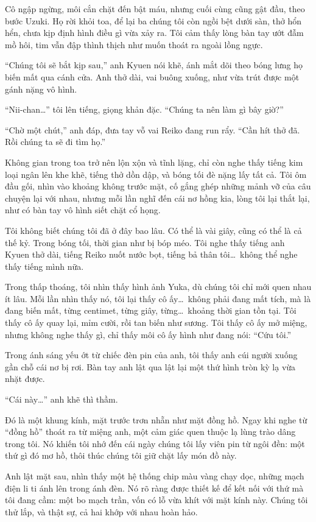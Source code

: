 \documentclass[../main.tex]{subfiles}
\begin{document}
Cô ngập ngừng, môi cắn chặt đến bật máu, nhưng cuối cùng cũng gật đầu, theo bước Uzuki. Họ rời khỏi toa, để lại ba chúng tôi còn ngồi bệt dưới sàn, thở hổn hển, chưa kịp định hình điều gì vừa xảy ra. Tôi cảm thấy lòng bàn tay ướt đẫm mồ hôi, tim vẫn đập thình thịch như muốn thoát ra ngoài lồng ngực.

``Chúng tôi sẽ bắt kịp sau,'' anh Kyuen nói khẽ, ánh mắt dõi theo bóng lưng họ biến mất qua cánh cửa. Anh thở dài, vai buông xuống, như vừa trút được một gánh nặng vô hình.

``Nii-chan\dots'' tôi lên tiếng, giọng khản đặc. ``Chúng ta nên làm gì bây giờ?''

``Chờ một chút,'' anh đáp, đưa tay vỗ vai Reiko đang run rẩy. ``Cần hít thở đã. Rồi chúng ta sẽ đi tìm họ.''

Không gian trong toa trở nên lộn xộn và tĩnh lặng, chỉ còn nghe thấy tiếng kim loại ngân lên khe khẽ, tiếng thở dồn dập, và bóng tối đè nặng lấy tất cả. Tôi ôm đầu gối, nhìn vào khoảng không trước mặt, cố gắng ghép những mảnh vỡ của câu chuyện lại với nhau, nhưng mỗi lần nghĩ đến cái nơ hồng kia, lòng tôi lại thắt lại, như có bàn tay vô hình siết chặt cổ họng.

Tôi không biết chúng tôi đã ở đây bao lâu. Có thể là vài giây, cũng có thể là cả thế kỷ. Trong bóng tối, thời gian như bị bóp méo. Tôi nghe thấy tiếng anh Kyuen thở dài, tiếng Reiko nuốt nước bọt, tiếng bả thân tôi\dots\ không thể nghe thấy tiếng mình nữa.

Trong thấp thoáng, tôi nhìn thấy hình ảnh Yuka, dù chúng tôi chỉ mới quen nhau ít lâu. Mỗi lần nhìn thấy nó, tôi lại thấy cô ấy\dots\ không phải đang mất tích, mà là đang biến mất, từng centimet, từng giây, từng\dots\ khoảng thời gian tồn tại. Tôi thấy cô ấy quay lại, mỉm cười, rồi tan biến như sương. Tôi thấy cô ấy mở miệng, nhưng không nghe thấy gì, chỉ thấy môi cô ấy hình như đang nói: ``Cứu tôi.''

Trong ánh sáng yếu ớt từ chiếc đèn pin của anh, tôi thấy anh cúi người xuống gần chỗ cái nơ bị rơi. Bàn tay anh lật qua lật lại một thứ hình tròn kỳ lạ vừa nhặt được.

``Cái này\dots'' anh khẽ thì thầm.

Đó là một khung kính, mặt trước trơn nhẵn như mặt đồng hồ. Ngay khi nghe từ ``đồng hồ'' thoát ra từ miệng anh, một cảm giác quen thuộc lạ lùng trào dâng trong tôi. Nó khiến tôi nhớ đến cái ngày chúng tôi lấy viên pin từ ngôi đền: một thứ gì đó mơ hồ, thôi thúc chúng tôi giữ chặt lấy món đồ này.

Anh lật mặt sau, nhìn thấy một hệ thống chip màu vàng chạy dọc, những mạch điện li ti ánh lên trong ánh đèn. Nó rõ ràng được thiết kế để kết nối với thứ mà tôi đang cầm: một bo mạch trần, vốn có lỗ vừa khít với mặt kính này. Chúng tôi thử lắp, và thật sự, cả hai khớp với nhau hoàn hảo.
\end{document}
